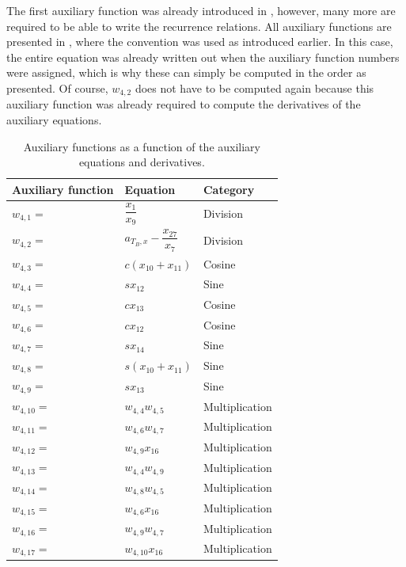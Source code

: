The first auxiliary function was already introduced in , however, many more are required to be able to write the recurrence relations. All auxiliary functions are presented in , where the convention was used as introduced earlier. In this case, the entire equation was already written out when the auxiliary function numbers were assigned, which is why these can simply be computed in the order as presented. Of course, $w_{4,2}$ does not have to be computed again because this auxiliary function was already required to compute the derivatives of the auxiliary equations.


\begin{longtable}{|p{1.5cm}|l|p{2cm}|}
\caption{Auxiliary functions as a function of the auxiliary equations and derivatives.}
\label{tab:auxFunc}
\endfirsthead
\endhead
\hline
\textbf{Auxiliary function} & \textbf{Equation} & \textbf{Category}  \\ \hline \hline
\hline 
$w_{4,1}=$  & $ \dfrac{x_{1}}{x_{9}} $ & Division \\ \hline
$w_{4,2}=$  & $ a_{T_{B},x}-\dfrac{x_{27}}{x_{7}} $ & Division \\ \hline
$w_{4,3}=$  & $ c\left(x_{10}+x_{11}\right) $ & Cosine  \\ \hline
$w_{4,4}=$  & $ sx_{12} $ & Sine \\ \hline
$w_{4,5}=$  & $ cx_{13} $ & Cosine  \\ \hline
$w_{4,6}=$  & $ cx_{12} $ & Cosine \\ \hline
$w_{4,7}=$  & $ sx_{14} $ & Sine \\ \hline
$w_{4,8}=$  & $ s\left(x_{10}+x_{11}\right) $ & Sine \\ \hline
$w_{4,9}=$ & $ sx_{13} $ & Sine \\ \hline
$w_{4,10}=$ & $ w_{4,4}w_{4,5} $ & Multiplication  \\ \hline
$w_{4,11}=$ & $ w_{4,6}w_{4,7} $ &  Multiplication \\ \hline
$w_{4,12}=$ & $ w_{4,9}x_{16} $ & Multiplication  \\ \hline
$w_{4,13}=$ & $ w_{4,4}w_{4,9} $ &  Multiplication \\ \hline
$w_{4,14}=$ & $ w_{4,8}w_{4,5} $ & Multiplication \\ \hline
$w_{4,15}=$ & $ w_{4,6}x_{16} $ &  Multiplication \\ \hline
$w_{4,16}=$ & $ w_{4,9}w_{4,7} $ & Multiplication  \\ \hline
$w_{4,17}=$ & $ w_{4,10}x_{16} $ & Multiplication \\ \hline

\end{longtable}
